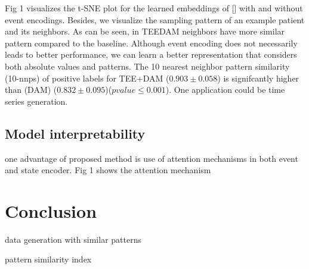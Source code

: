\documentclass[journal,twoside,web]{ieeecolor}
\begin{document}
Fig 1 visualizes the t-SNE plot for the learned embeddings of [] with and without event encodings. Besides, we visualize the sampling pattern of an example patient and its neighbors. As can be seen,  in TEEDAM neighbors have more similar pattern compared to the baseline. Although event encoding does not necessarily leads to better performance, we can learn a better representation that considers both absolute values and patterns.
The 10 nearest neighbor pattern similarity (10-nnps) of positive labels for TEE+DAM ($0.903 \pm 0.058 $) is signifcantly higher than (DAM) ($0.832 \pm 0.095$)($pvalue \leq 0.001$).
One application could be time series generation.



\subsection{Model interpretability}

one advantage of proposed method is use of attention mechanisms in both event and state encoder.
Fig 1 shows the attention mechanism





\section{Conclusion}
\label{sec:Conclusion}

data generation with similar patterns

pattern similarity index










\end{document}
